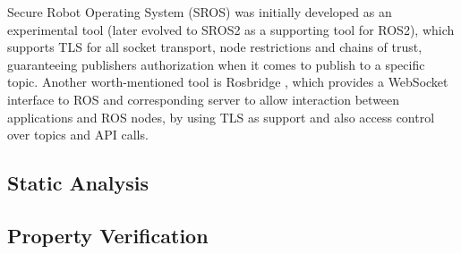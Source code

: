 Secure Robot Operating System (SROS) \cite{white2016sros} was initially developed as an experimental tool (later evolved to SROS2 as a supporting tool for ROS2), which supports TLS for all socket transport, node restrictions and chains of trust, guaranteeing publishers authorization when it comes to publish to a specific topic. Another worth-mentioned tool is Rosbridge \cite{crick2017rosbridge}, which provides a WebSocket interface to ROS and corresponding server to allow interaction between applications and ROS nodes, by using TLS as support and also access control over topics and API calls. 

\subsection{Static Analysis}

\subsection{Property Verification}
